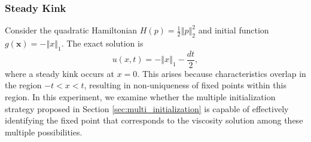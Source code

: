 \documentclass[review,hidelinks,onefignum,onetabnum]{siamart250106}
\newcommand{\bx}{\mathbf{x}}
\begin{document}
\subsubsection{Steady Kink}
Consider the quadratic Hamiltonian
 $H\left(p\right) = \frac{1}{2}\left\Vert p\right\Vert_2^2$ and initial function $g\left(\bx\right) = -\left\Vert x\right\Vert_1$. 
The exact solution is 
\[
u\left(x,t\right)=-\left\Vert x\right\Vert_1-\frac{dt}{2},
\] where a steady kink occurs at \(x=0\). This arises because characteristics overlap in the region \(-t < x < t\), resulting in non-uniqueness of fixed points within this region. In this experiment, we examine whether the multiple initialization strategy proposed in Section \ref{sec:multi_initialization} is capable of effectively identifying the fixed point that corresponds to the viscosity solution among these multiple possibilities.
\end{document}
